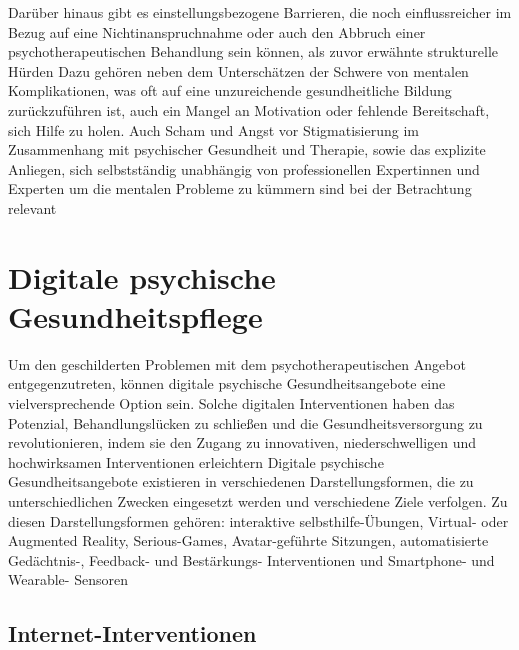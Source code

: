 Darüber hinaus gibt es einstellungsbezogene Barrieren, die noch einflussreicher im Bezug auf eine Nichtinanspruchnahme 
oder auch den Abbruch einer psychotherapeutischen Behandlung  sein können, als zuvor erwähnte strukturelle Hürden 
\cite[S.11]{weisel_innovations_2021} %
Dazu gehören neben dem Unterschätzen der Schwere von mentalen Komplikationen, was oft auf eine unzureichende 
gesundheitliche Bildung zurückzuführen ist, auch ein Mangel an Motivation oder fehlende Bereitschaft, 
sich Hilfe zu holen. Auch Scham und Angst vor Stigmatisierung im Zusammenhang mit psychischer Gesundheit und Therapie, 
sowie das explizite Anliegen, sich selbstständig unabhängig von professionellen 
Expertinnen und Experten um die mentalen Probleme zu kümmern sind bei der Betrachtung relevant 
\cite[S.11]{weisel_innovations_2021} %





\section{Digitale psychische Gesundheitspflege}\label{subsec:digitale_psychische_gesundheit}


Um den geschilderten Problemen mit dem psychotherapeutischen Angebot entgegenzutreten, 
können digitale psychische Gesundheitsangebote eine vielversprechende Option sein.
Solche digitalen Interventionen haben das Potenzial, Behandlungslücken zu schließen 
und die Gesundheitsversorgung zu revolutionieren, indem sie den Zugang zu innovativen, 
niederschwelligen und hochwirksamen Interventionen erleichtern 
\cite[S.138]{weisel_innovations_2021} %
Digitale psychische Gesundheitsangebote existieren in verschiedenen Darstellungsformen, 
die zu unterschiedlichen Zwecken eingesetzt werden und verschiedene Ziele verfolgen. 
Zu diesen Darstellungsformen gehören: interaktive selbsthilfe-Übungen, Virtual- oder Augmented Reality, 
Serious-Games, Avatar-geführte Sitzungen, automatisierte Gedächtnis-, Feedback- und Bestärkungs- Interventionen 
und Smartphone- und Wearable- Sensoren \cite[S.10]{weisel_innovations_2021} %



\subsection{Internet-Interventionen}\label{subsubsec:Internet-Interventionen}


